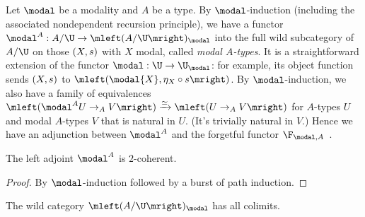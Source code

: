 Let $\modal$ be a modality and $A$ be a type. By $\modal$-induction (including the associated nondependent recursion principle), we have a functor $\modal^A : A/\U \to \mleft(A/\U\mright)_{\modal}$ into the full wild subcategory of $A/\U$ on those $\mleft(X,s\mright)$ with $X$ modal, called \emph{modal $A$-types}. It is a straightforward extension of the functor $\modal : \U \to \U_{\modal}$: for example, its object function sends $\mleft(X,s\mright)$ to $\mleft(\modal{X} , \eta_X \circ s \mright)$. By $\modal$-induction, we also have a family of equivalences $\mleft(\modal^A{U} \to_A V\mright) \xrightarrow{\simeq} \mleft(U \to_A V \mright)$ for $A$-types $U$ and modal $A$-types $V$ that is natural in $U$. (It's trivially natural in $V$.) Hence we have an adjunction between $\modal^A$ and the forgetful functor $\F_{\modal,A}$~\cite[]{2cohagda-pub}.
\begin{thm} \label{mod2coh}
The left adjoint $\modal^A$ is $2$-coherent.
\end{thm}
\begin{proof}
By $\modal$-induction followed by a burst of path induction.
\end{proof}
\begin{cor}  \label{modcolbuild}
The wild category $\mleft(A/\U\mright)_{\modal}$ has all colimits.
\end{cor}
